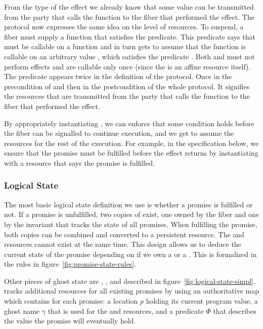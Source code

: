 From the type of the \esuspend{} effect we already know that some value can be transmitted from the party that calls the  function to the fiber that performed the effect.
The \esuspend{} protocol now expresses the same idea on the level of resources.
To suspend, a fiber must supply a function  that satisfies the \gsIsReg{} predicate.
This predicate says that  must be callable on a  function and in turn gets to assume that the  function is callable on an arbitrary value , which satisfies the predicate .
Both  and  must not perform effects and are callable only once (since the \ewpt{} is an affine resource itself).
The predicate  appears twice in the definition of the protocol.
Once in the precondition of  and then in the postcondition of the whole protocol.
It signifies the resources that are transmitted from the party that calls the  function to the fiber that performed the effect.

By appropriately instantiating , we can enforce that some condition holds before the fiber can be signalled to continue execution, and we get to assume the resources  for the rest of the execution.
For example, in the  specification below, we ensure that the promise must be fulfilled before the effect returns by instantiating  with a resource that says the promise is fulfilled.

\subsubsection{Logical State}
\label{sec:sched-spec-state}

The most basic logical state definition we use is whether a promise is fulfilled or not.
If a promise  is unfulfilled, two copies of \gspwait{} exist, one owned by the fiber and one by the invariant that tracks the state of all promises.
When fulfilling the promise, both copies can be combined and converted to a persistent \gspdone{} resource.
The \gspwait{} and \gspdone{} resources cannot exist at the same time.
This design allows us to deduce the current state of the promise depending on if we own a \gspwait{} or a \gspdone{}.
This is formalized in the rules in figure~\ref{fig:promise-state-rules}.

Other pieces of ghost state are \gsPInvIn{}, \gsIsPr{}, and \gsReady{} described in figure~\ref{fig:logical-state-simpl}.
\gsPInvIn{} tracks additional resources for all existing promises by using an authoritative map which contains for each promise:
a location \(p\) holding its current program value,
a ghost name \(\gamma\) that is used for the \gspwait{} and \gspdone{} resources,
and a predicate \(Φ\) that describes the value the promise will eventually hold.

